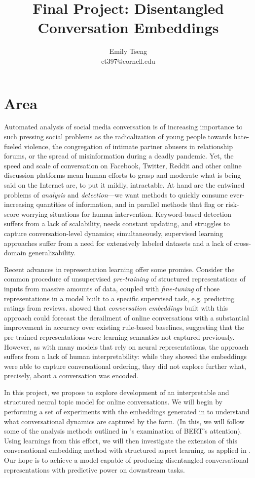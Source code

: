 \documentclass[11pt]{article}
\title{Final Project: Disentangled Conversation Embeddings}
\author{Emily Tseng \\ et397@cornell.edu }
\begin{document}
\maketitle{}
\section{Area}

Automated analysis of social media conversation is of increasing importance to such pressing social problems as the radicalization of young people towards hate-fueled violence, the congregation of intimate partner abusers in relationship forums, or the spread of misinformation during a deadly pandemic. Yet, the speed and scale of conversation on Facebook, Twitter, Reddit and other online discussion platforms mean human efforts to grasp and moderate what is being said on the Internet are, to put it mildly, intractable. At hand are the entwined problems of \textit{analysis} and \textit{detection}---we want methods to quickly consume ever-increasing quantities of information, and in parallel methods that flag or risk-score worrying situations for human intervention. Keyword-based detection suffers from a lack of scalability, needs constant updating, and struggles to capture conversation-level dynamics; simultaneously, supervised learning approaches suffer from a need for extensively labeled datasets and a lack of cross-domain generalizability.

Recent advances in representation learning offer some promise. Consider the common procedure of unsupervised \textit{pre-training} of structured representations of inputs from massive amounts of data, coupled with \textit{fine-tuning} of those representations in a model built to a specific supervised task, e.g. predicting ratings from reviews. \cite{Chang-Trouble:19} showed that \textit{conversation embeddings} built with this approach could forecast the derailment of online conversations with a substantial improvement in accuracy over existing rule-based baselines, suggesting that the pre-trained representations were learning semantics not captured previously. However, as with many models that rely on neural representations, the approach suffers from a lack of human interpretability: while they showed the embeddings were able to capture conversational ordering, they did not explore further what, precisely, about a conversation was encoded.

In this project, we propose to explore development of an interpretable and structured neural topic model for online conversations. We will begin by performing a set of experiments with the embeddings generated in \cite{Chang-Trouble:19} to understand what conversational dynamics are captured by the form. (In this, we will follow some of the analysis methods outlined in \cite{clark2019does}'s examination of BERT's attention). Using learnings from this effort, we will then investigate the extension of this conversational embedding method with structured aspect learning, as applied in \cite{esmaeili19}. Our hope is to achieve a model capable of producing disentangled conversational representations with predictive power on downstream tasks. 
\end{document}

